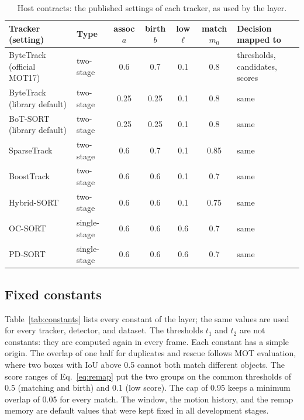 \documentclass[pdflatex,sn-mathphys-num,iicol]{sn-jnl}
\begin{document}
\begin{table}[t]
\caption{Host contracts: the published settings of each tracker, as used by
the layer.}
\label{tab:contracts}
\centering\footnotesize
\setlength{\tabcolsep}{4pt}
\begin{tabular}{@{}>{\raggedright\arraybackslash}p{30mm}lcccc>{\raggedright\arraybackslash}p{32mm}@{}}
\toprule
Tracker (setting) & Type & assoc $a$ & birth $b$ & low $\ell$ & match $m_0$ & Decision mapped to\\
\midrule
ByteTrack (official MOT17) & two-stage & 0.6 & 0.7 & 0.1 & 0.8 & thresholds, candidates, scores\\
ByteTrack (library default) & two-stage & 0.25 & 0.25 & 0.1 & 0.8 & same\\
BoT-SORT (library default) & two-stage & 0.25 & 0.25 & 0.1 & 0.8 & same\\
SparseTrack & two-stage & 0.6 & 0.7 & 0.1 & 0.85 & same\\
BoostTrack & two-stage & 0.6 & 0.6 & 0.1 & 0.7 & same\\
Hybrid-SORT & two-stage & 0.6 & 0.6 & 0.1 & 0.75 & same\\
OC-SORT & single-stage & 0.6 & 0.6 & 0.6 & 0.7 & same\\
PD-SORT & single-stage & 0.6 & 0.6 & 0.6 & 0.7 & same\\
\bottomrule
\end{tabular}
\end{table}

\subsection{Fixed constants}\label{sec:constants}
Table~\ref{tab:constants} lists every constant of the layer; the same values
are used for every tracker, detector, and dataset. The thresholds $t_1$ and
$t_2$ are not constants: they are computed again in every frame. Each
constant has a simple origin. The overlap of one half for duplicates and
rescue follows MOT evaluation, where two boxes with IoU above 0.5 cannot both
match different objects. The score ranges of Eq.~\eqref{eq:remap} put the two
groups on the common thresholds of 0.5 (matching and birth) and 0.1 (low
score). The cap of 0.95 keeps a minimum overlap of 0.05 for every match. The
window, the motion history, and the remap memory are default values that were
kept fixed in all development stages.
\end{document}
